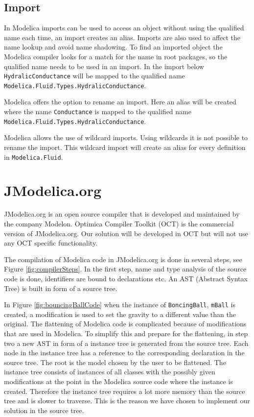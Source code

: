 \documentclass{cslthse-msc}
\begin{document}
\subsection{Import}
In Modelica imports can be used to access an object without using the qualified name each time, an import creates an alias. Imports are also used to affect the name lookup and avoid name shadowing. To find an imported object the Modelica compiler looks for a match for the name in root packages, so the qualified name needs to be used in an import. In the import below \texttt{HydralicConductance} will be mapped to the qualified name \texttt{Modelica.Fluid.Types.HydralicConductance}.



Modelica offers the option to rename an import. Here an alias will be created where the name \texttt{Conductance} is mapped to the qualified name \texttt{Modelica.Fluid.Types.HydralicConductance}.



Modelica allows the use of wildcard imports. Using wildcards it is not possible to rename the import. This wildcard import will create an alias for every definition in \texttt{Modelica.Fluid}.



\section{JModelica.org}
JModelica.org is an open source compiler that is developed and maintained by the company Modelon. Optimica Compiler Toolkit (OCT) is the commercial version of JModelica.org. Our solution will be developed in OCT but will not use any OCT specific functionality. 

The compilation of Modelica code in JModelica.org is done in several steps, see Figure \ref{fig:compilerSteps}. \cite{aakesson2010implementation} In the first step, name and type analysis of the source code is done, identifiers are bound to declarations etc. An AST (Abstract Syntax Tree) is built in form of a source tree.

In Figure \ref{fig:bouncingBallCode} when the instance of \texttt{BoncingBall}, \texttt{mBall} is created, a modification is used to set the gravity to a different value than the original. The flattening of Modelica code is complicated because of modifications that are used in Modelica. To simplify this and  prepare for the flattening, in step two a new AST in form of a instance tree is generated from the source tree. Each node in the instance tree has a reference to the corresponding declaration in the source tree. The root is the model chosen by the user to be flattened. The instance tree consists of instances of all classes with the possibly given modifications at the point in the Modelica source code where the instance is created. Therefore the instance tree requires a lot more memory than the source tree and is slower to traverse. This is the reason we have chosen to implement our solution in the source tree. 
\end{document}
